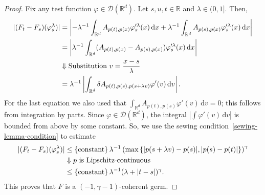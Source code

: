 \begin{proof}
  Fix any test function \( \varphi \in \mathcal{D}(\mathbb{R}^d) \). Let \( s,u,t \in \mathbb{R} \) and \( \lambda \in (0,1] \). Then,
  \begin{align*}
    |(F_t - F_s)(\varphi^\lambda_s)| 
    &= \left |-\lambda^{-1} \int_{\mathbb{R}^d} A_{p(t), p(x)} \varphi'^{\lambda}_s(x) \, \mathrm{d}x + \lambda^{-1}\int_{\mathbb{R}^d} A_{p(s), p(x)} \varphi'^{\lambda}_s(x) \, \mathrm{d}x \right | \\
    &= \left | \lambda^{-1} \int_{\mathbb{R}^d} (A_{p(t), p(x)} - A_{p(s), p(x)}) \varphi'^\lambda_s(x) \, \mathrm{d}x \right | \\
    &\Downarrow \text{Substitution \( v = \frac{x -s}{\lambda} \)} \\
    &= \lambda^{-1} \left | \int_{\mathbb{R}^d} \delta A_{p(t), p(s), p(s + \lambda v)} \varphi'(v) \, \mathrm{d}v \right |.
  \end{align*}
  For the last equation we also used that \( \int_{\mathbb{R}^d} A_{p(t), p(s)} \varphi'(v) \, \mathrm{d}v = 0 \); this follows from integration by parts. Since \( \varphi \in \mathcal{D}(\mathbb{R}^d) \), the integral \( |\int \varphi'(v) \, \mathrm{d}v |  \) is bounded from above by some constant. So, we use the sewing condition~\eqref{sewing-lemma-condition} to estimate 
  \begin{align*}
    |(F_t - F_s)(\varphi^\lambda_s)|  &\leq \left\{ \mathrm{constant} \right\} \lambda^{-1}\left( 
      \max\left\{ 
        |p(s + \lambda v) - p(s)|,
        |p(s) - p(t)|
       \right\}
     \right)^\gamma \\
     &\Downarrow \text{\( p \) is Lipschitz-continuous} \\
     &\leq \left\{ \mathrm{constant} \right\} \lambda^{-1}(\lambda + |t-s|)^\gamma. 
  \end{align*}
  This proves that \( F \) is a \( (-1, \gamma - 1) \)-coherent germ.
\end{proof}

